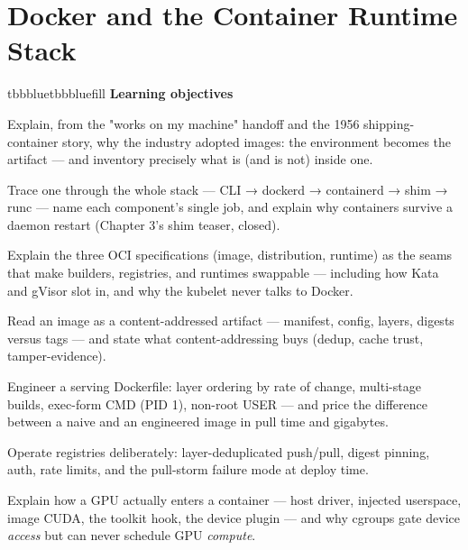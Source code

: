 \setcounter{chapter}{3}
\chapter{Docker and the Container Runtime Stack}

\begin{calloutbox}{tbbblue}{tbbbluefill}
{\normalsize\bfseries\color{tbbblue}Learning objectives}\par\vspace{3pt}
\begin{tbbitemize}
  \item Explain, from the "works on my machine" handoff and the 1956 shipping-container story, why the industry adopted images: the environment becomes the artifact — and inventory precisely what is (and is not) inside one.
  \item Trace one  through the whole stack — CLI → dockerd → containerd → shim → runc — name each component's single job, and explain why containers survive a daemon restart (Chapter 3's shim teaser, closed).
  \item Explain the three OCI specifications (image, distribution, runtime) as the seams that make builders, registries, and runtimes swappable — including how Kata and gVisor slot in, and why the kubelet never talks to Docker.
  \item Read an image as a content-addressed artifact — manifest, config, layers, digests versus tags — and state what content-addressing buys (dedup, cache trust, tamper-evidence).
  \item Engineer a serving Dockerfile: layer ordering by rate of change, multi-stage builds, exec-form CMD (PID 1), non-root USER — and price the difference between a naive and an engineered image in pull time and gigabytes.
  \item Operate registries deliberately: layer-deduplicated push/pull, digest pinning, auth, rate limits, and the pull-storm failure mode at deploy time.
  \item Explain how a GPU actually enters a container — host driver, injected userspace, image CUDA, the toolkit hook, the device plugin — and why cgroups gate device \textit{access} but can never schedule GPU \textit{compute}.
\end{tbbitemize}
\end{calloutbox}

